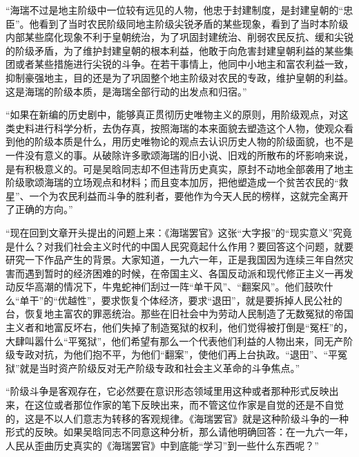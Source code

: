 \begin{maonote}
“海瑞不过是地主阶级中一位较有远见的人物，他忠于封建制度，是封建皇朝的“忠臣”。他看到了当时农民阶级同地主阶级尖锐矛盾的某些现象，看到了当时本阶级内部某些腐化现象不利于皇朝统治，为了巩固封建统治、削弱农民反抗、缓和尖锐的阶级矛盾，为了维护封建皇朝的根本利益，他敢于向危害封建皇朝利益的某些集团或者某些措施进行尖锐的斗争。在若干事情上，他同中小地主和富农利益一致，抑制豪强地主，目的还是为了巩固整个地主阶级对农民的专政，维护皇朝的利益。这是海瑞的阶级本质，是海瑞全部行动的出发点和归宿。”

“如果在新编的历史剧中，能够真正贯彻历史唯物主义的原则，用阶级观点，对这类史料进行科学分析，去伪存真，按照海瑞的本来面貌去塑造这个人物，使观众看到他的阶级本质是什么，用历史唯物论的观点去认识历史人物的阶级面貌，也不是一件没有意义的事。从破除许多歌颂海瑞的旧小说、旧戏的所散布的坏影响来说，是有积极意义的。可是吴晗同志却不但违背历史真实，原封不动地全部袭用了地主阶级歌颂海瑞的立场观点和材料；而且变本加厉，把他塑造成一个贫苦农民的“救星”、一个为农民利益而斗争的胜利者，要他作为今天人民的榜样，这就完全离开了正确的方向。”

“现在回到文章开头提出的问题上来：《海瑞罢官》这张“大字报”的“现实意义”究竟是什么？对我们社会主义时代的中国人民究竟起什么作用？要回答这个问题，就要研究一下作品产生的背景。大家知道，一九六一年，正是我国因为连续三年自然灾害而遇到暂时的经济困难的时候，在帝国主义、各国反动派和现代修正主义一再发动反华高潮的情况下，牛鬼蛇神们刮过一阵“单干风”、“翻案风”。他们鼓吹什么“单干”的“优越性”，要求恢复个体经济，要求“退田”，就是要拆掉人民公社的台，恢复地主富农的罪恶统治。那些在旧社会中为劳动人民制造了无数冤狱的帝国主义者和地富反坏右，他们失掉了制造冤狱的权利，他们觉得被打倒是“冤枉”的，大肆叫嚣什么“平冤狱”，他们希望有那么一个代表他们利益的人物出来，同无产阶级专政对抗，为他们抱不平，为他们“翻案”，使他们再上台执政。“退田”、“平冤狱”就是当时资产阶级反对无产阶级专政和社会主义革命的斗争焦点。”

“阶级斗争是客观存在，它必然要在意识形态领域里用这种或者那种形式反映出来，在这位或者那位作家的笔下反映出来，而不管这位作家是自觉的还是不自觉的，这是不以人们意志为转移的客观规律。《海瑞罢官》就是这种阶级斗争的一种形式的反映。如果吴晗同志不同意这种分析，那么请他明确回答：在一九六一年，人民从歪曲历史真实的《海瑞罢官》中到底能“学习”到一些什么东西呢？”


\end{maonote}

